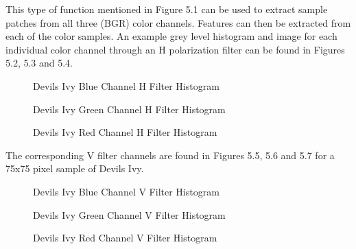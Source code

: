 This type of function mentioned in Figure 5.1 can be used to extract sample patches from all three (BGR) color channels. Features can then be extracted from each of the color samples.  An example grey level histogram and image for each individual color channel through an H polarization filter can be found in Figures 5.2, 5.3 and 5.4.
\begin{figure}
    \begin{center}
    \end{center}
    \caption{Devils Ivy Blue Channel H Filter Histogram}
    \label{fig:polarization}
\end{figure}
\begin{figure}
    \begin{center}
    \end{center}
    \caption{Devils Ivy Green Channel H Filter Histogram}
    \label{fig:polarization}
\end{figure}
\begin{figure}
    \begin{center}
    \end{center}
    \caption{Devils Ivy Red Channel H Filter Histogram}
    \label{fig:polarization}
\end{figure}
The corresponding V filter channels are found in Figures 5.5, 5.6 and 5.7 for a 75x75 pixel sample of Devils Ivy.
\begin{figure}
    \begin{center}
    \end{center}
    \caption{Devils Ivy Blue Channel V Filter Histogram}
    \label{fig:polarization}
\end{figure}
\begin{figure}
    \begin{center}
    \end{center}
    \caption{Devils Ivy Green Channel V Filter Histogram}
    \label{fig:polarization}
\end{figure}
\begin{figure}
    \begin{center}
    \end{center}
    \caption{Devils Ivy Red Channel V Filter Histogram}
    \label{fig:polarization}
\end{figure}
